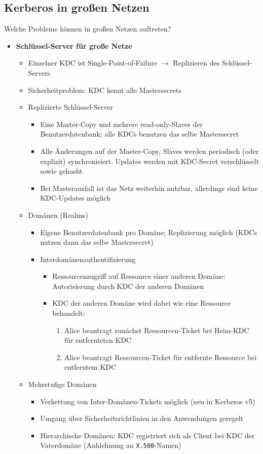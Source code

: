 \subsection{Kerberos in großen Netzen}
Welche Probleme können in großen Netzen auftreten?
\begin{itemize}
	\item \textbf{Schlüssel-Server für große Netze}
	\begin{itemize}
		\item Einzelner KDC ist Single-Point-of-Failure \(\rightarrow\) Replizieren des Schlüssel-Servers
		\item Sicherheitproblem: KDC kennt alle Mastersecrets
		\item Replizierte Schlüssel-Server
		\begin{itemize}
			\item Eine Master-Copy und mehrere read-only-Slaves der Benutzerdatenbank; alle KDCs benutzen das selbe Mastersecret
			\item Alle Änderungen auf der Master-Copy, Slaves werden periodisch (oder explizit) synchronisiert. Updates werden mit KDC-Secret verschlüsselt sowie gehasht
			\item Bei Masterausfall ist das Netz weiterhin nutzbar, allerdings sind keine KDC-Updates möglich
		\end{itemize}
		\item Domänen (Realms)
		\begin{itemize}
			\item Eigene Benutzerdatenbank pro Domäne; Replizierung möglich (KDCs nutzen dann das selbe Mastersecret)
			\item Interdomänenauthentifizierung
			\begin{itemize}
				\item Ressourcenzugriff auf Ressource einer anderen Domäne: Autorisierung durch KDC der anderen Domänen
				\item KDC der anderen Domäne wird dabei wie eine Ressource behandelt:
				\begin{enumerate}
					\item Alice beantragt zunächst Ressourcen-Ticket bei Heim-KDC für entfernteten KDC
					\item Alice beantragt Ressourcen-Ticket für entfernte Ressource bei entferntem KDC
				\end{enumerate}
			\end{itemize}
		\end{itemize}
		\item Mehrstufige Domänen
		\begin{itemize}
			\item Verkettung von Inter-Domänen-Tickets möglich (neu in Kerberos v5)
			\item Umgang über Sicherheitsrichtlinien in den Anwendungen geregelt
			\item Hierarchische Domänen: KDC registriert sich als Client bei KDC der Vaterdomäne (Anhlehnung an \texttt{X.500}-Namen)
		\end{itemize}
	\end{itemize}
\end{itemize}



